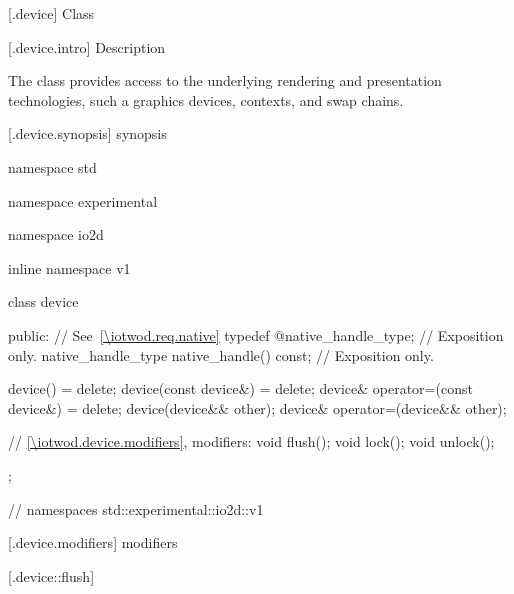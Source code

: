  [\iotwod.device] {Class }

 [\iotwod.device.intro] { Description}

\pnum
{}%
The  class provides access to the underlying rendering and 
presentation technologies, such a graphics devices, contexts, and swap chains.

 [\iotwod.device.synopsis] { synopsis}

\begin{codeblock}
namespace std { namespace experimental { namespace io2d { inline namespace v1 {
  class device {
  public:
    // See~\ref{\iotwod.req.native}
    typedef @\impdef@ native_handle_type; // Exposition only.
    native_handle_type native_handle() const; // Exposition only.

    device() = delete;
    device(const device&) = delete;
    device& operator=(const device&) = delete;
    device(device&& other);
    device& operator=(device&& other);

    // \ref{\iotwod.device.modifiers}, modifiers:
    void flush();
    void lock();
    void unlock();
  };
} } } } // namespaces std::experimental::io2d::v1
\end{codeblock}

 [\iotwod.device.modifiers] { modifiers}

 [\iotwod.device::flush] {}

